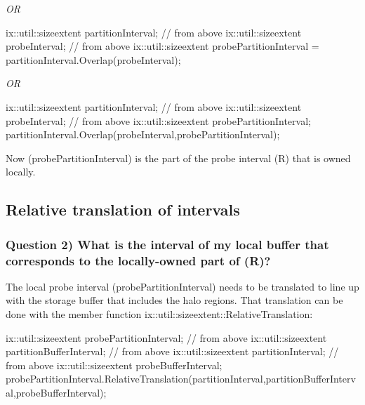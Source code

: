 {\itshape OR}


\begin{DoxyCode}
ix::util::sizeextent partitionInterval; \textcolor{comment}{// from above}
ix::util::sizeextent probeInterval;     \textcolor{comment}{// from above }
ix::util::sizeextent probePartitionInterval = partitionInterval.Overlap(probeInterval);            
\end{DoxyCode}


{\itshape OR}


\begin{DoxyCode}
ix::util::sizeextent partitionInterval; \textcolor{comment}{// from above}
ix::util::sizeextent probeInterval;     \textcolor{comment}{// from above }
ix::util::sizeextent probePartitionInterval;                                           
partitionInterval.Overlap(probeInterval,probePartitionInterval);            
\end{DoxyCode}




Now (probe\+Partition\+Interval) is the part of the probe interval (R) that is owned locally.\hypertarget{developer_reference_translation}{}\subsection{Relative translation of intervals}\label{developer_reference_translation}
\subsubsection*{Question 2) What is the interval of my local buffer that corresponds to the locally-\/owned part of (R)?}

The local probe interval (probe\+Partition\+Interval) needs to be translated to line up with the storage buffer that includes the halo regions. That translation can be done with the member function ix\+::util\+::sizeextent\+::\+Relative\+Translation\+:


\begin{DoxyCode}
ix::util::sizeextent probePartitionInterval;  \textcolor{comment}{// from above}
ix::util::sizeextent partitionBufferInterval; \textcolor{comment}{// from above}
ix::util::sizeextent partitionInterval;       \textcolor{comment}{// from above}
ix::util::sizeextent probeBufferInterval;
probePartitionInterval.RelativeTranslation(partitionInterval,partitionBufferInterval,probeBufferInterval);
\end{DoxyCode}




